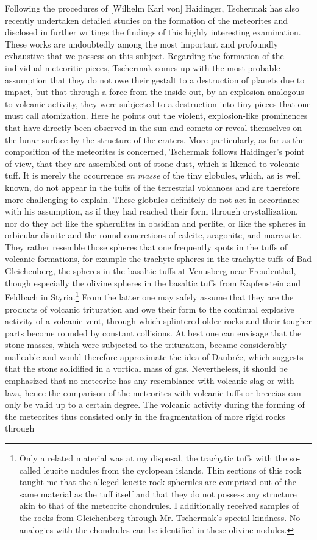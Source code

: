 \documentclass[a4paper, 12pt, oneside]{article}
\begin{document}
Following the procedures of [Wilhelm Karl von] Haidinger, Tschermak has also recently undertaken detailed studies on the formation of the meteorites and disclosed in further writings the findings of this highly interesting examination. These works are undoubtedly among the most important and profoundly exhaustive that we possess on this subject. Regarding the formation of the individual meteoritic pieces, Tschermak comes up with the most probable assumption that they do not owe their gestalt to a destruction of planets due to impact, but that through a force from the inside out, by an explosion analogous to volcanic activity, they were subjected to a destruction into tiny pieces that one must call atomization. Here he points out the violent, explosion-like prominences that have directly been observed in the sun and comets or reveal themselves on the lunar surface by the structure of the craters. More particularly, as far as the composition of the meteorites is concerned, Tschermak follows Haidinger's point of view, that they are assembled out of stone dust, which is likened to volcanic tuff. It is merely the occurrence \emph{en masse} of the tiny globules, which, as is well known, do not appear in the tuffs of the terrestrial volcanoes and are therefore more challenging to explain. These globules definitely do not act in accordance with his assumption, as if they had reached their form through crystallization, nor do they act like the spherulites in obsidian and perlite, or like the spheres in orbicular diorite and the round concretions of calcite, aragonite, and marcasite. They rather resemble those spheres that one frequently spots in the tuffs of volcanic formations, for example the trachyte spheres in the trachytic tuffs of Bad Gleichenberg, the spheres in the basaltic tuffs at Venusberg near Freudenthal, though especially the olivine spheres in the basaltic tuffs from Kapfenstein and Feldbach in Styria.\footnote{Only a related material was at my disposal, the trachytic tuffs with the so-called leucite nodules from the cyclopean islands. Thin sections of this rock taught me that the alleged leucite rock spherules are comprised out of the same material as the tuff itself and that they do not possess any structure akin to that of the meteorite chondrules. I additionally received samples of the rocks from Gleichenberg through Mr. Tschermak's special kindness. No analogies with the chondrules can be identified in these olivine nodules.} From the latter one may safely assume that they are the products of volcanic trituration and owe their form to the continual explosive activity of a volcanic vent, through which splintered older rocks and their tougher parts become rounded by constant collisions. At best one can envisage that the stone masses, which were subjected to the trituration, became considerably malleable and would therefore approximate the idea of Daubrée, which suggests that the stone solidified in a vortical mass of gas. Nevertheless, it should be emphasized that no meteorite has any resemblance with volcanic slag or with lava, hence the comparison of the meteorites with volcanic tuffs or breccias can only be valid up to a certain degree. The volcanic activity during the forming of the meteorites thus consisted only in the fragmentation of more rigid rocks through 
\end{document}
